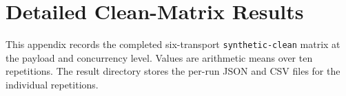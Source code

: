 \section{Detailed Clean-Matrix Results}
\label{app:clean-matrix-details}

This appendix records the completed six-transport \texttt{synthetic-clean} matrix at the payload and concurrency level. Values are arithmetic means over ten repetitions. The result directory stores the per-run JSON and CSV files for the individual repetitions.

\begin{table}[H]
    \centering
    \footnotesize
    \caption{Synthetic bulk-transfer throughput by message size, averaged over ten repetitions and concurrency levels 1, 4, 8, and 16.}
    \label{tab:grpc-per-size}
    \setlength{\tabcolsep}{3pt}
\end{table}

